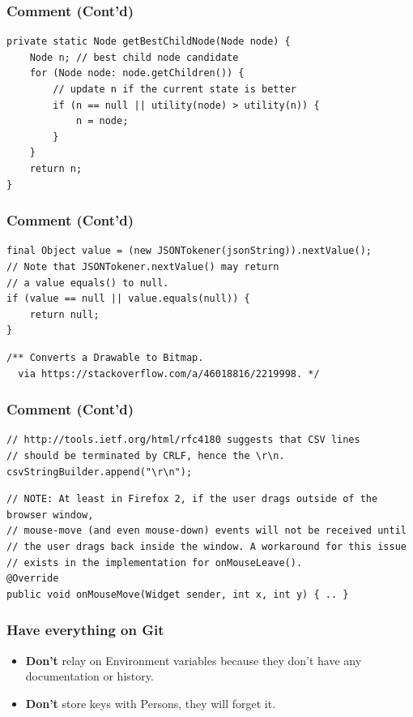 \documentclass{efd-lecture}
\begin{document}
\begin{frame}[fragile]
  \frametitle{Comment (Cont'd)}
  \begin{verbatim}
private static Node getBestChildNode(Node node) {
    Node n; // best child node candidate
    for (Node node: node.getChildren()) {
        // update n if the current state is better
        if (n == null || utility(node) > utility(n)) {
            n = node;
        }
    }
    return n;
}
  \end{verbatim}
\end{frame}

\begin{frame}[fragile]
  \frametitle{Comment (Cont'd)}
  \begin{verbatim}
final Object value = (new JSONTokener(jsonString)).nextValue();
// Note that JSONTokener.nextValue() may return
// a value equals() to null.
if (value == null || value.equals(null)) {
    return null;
}
  \end{verbatim}
  \begin{verbatim}
/** Converts a Drawable to Bitmap.
  via https://stackoverflow.com/a/46018816/2219998. */
  \end{verbatim}
\end{frame}

\begin{frame}[fragile]
  \frametitle{Comment (Cont'd)}
  \scriptsize
  \begin{verbatim}
// http://tools.ietf.org/html/rfc4180 suggests that CSV lines
// should be terminated by CRLF, hence the \r\n.
csvStringBuilder.append("\r\n");
  \end{verbatim}
  \begin{verbatim}
// NOTE: At least in Firefox 2, if the user drags outside of the browser window,
// mouse-move (and even mouse-down) events will not be received until
// the user drags back inside the window. A workaround for this issue
// exists in the implementation for onMouseLeave().
@Override
public void onMouseMove(Widget sender, int x, int y) { .. }
  \end{verbatim}
\end{frame}

\begin{frame}
  \frametitle{Have everything on Git}
  \begin{itemize}
    \item \textbf{\color{RubineRed}Don't} relay on Environment variables because they don't have any documentation or history.
    \item \textbf{\color{RubineRed}Don't} store keys with Persons, they will forget it.
  \end{itemize}
\end{frame}
\end{document}
